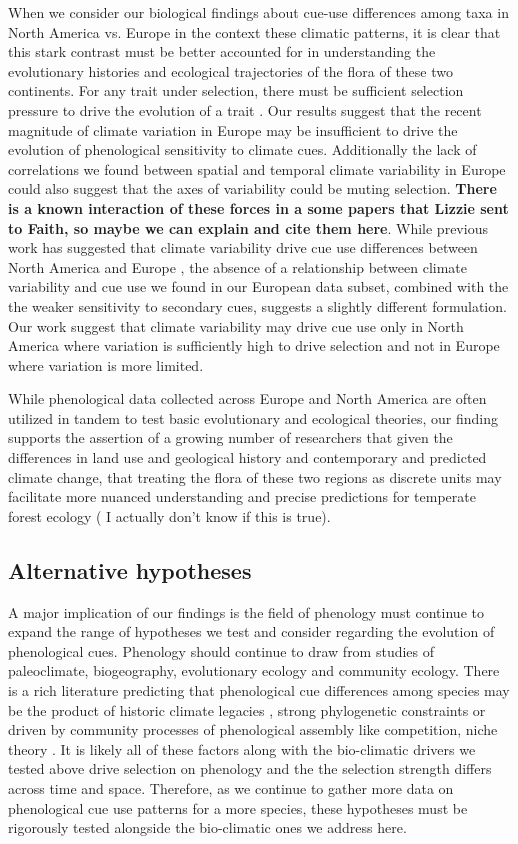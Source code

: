 \documentclass[12pt]{article}\usepackage[]{graphicx}\usepackage[]{color}
\begin{document}
\noindent When we consider our biological findings about cue-use differences among taxa in North America vs. Europe in the context these climatic patterns, it is clear that this stark contrast must be better accounted for in understanding the evolutionary histories and ecological trajectories of the flora of these two continents. For any trait under selection, there must be sufficient selection pressure to drive the evolution of a trait \citep{}. Our results suggest that the recent magnitude of climate variation in Europe may be insufficient to drive the evolution of phenological sensitivity to climate cues. Additionally the lack of correlations we found between spatial and temporal climate variability in Europe could also suggest that the axes of variability could be muting selection. \textbf{There is a known interaction of these forces in a some papers that Lizzie sent to Faith, so maybe we can explain and cite them here}. While previous work has suggested that climate variability drive cue use differences between North America and Europe \citep{Zohner:2017aa}, the absence of a relationship between climate variability and cue use we found in our European data subset, combined with the the weaker sensitivity to secondary cues, suggests a slightly different formulation. Our work suggest that climate variability may drive cue use only in North America where variation is sufficiently high to drive selection and not in Europe where variation is more limited. 

\noindeny While phenological data collected across Europe and North America are often utilized in tandem to test basic evolutionary and ecological theories, our finding supports the assertion of a growing number of researchers that given the differences in land use and geological history and contemporary and predicted climate change, that treating the flora of these two regions as discrete units may facilitate more nuanced understanding and precise predictions for temperate forest ecology ( I actually don't know if this is true).

\subsection*{Alternative hypotheses}

A major implication of our findings is the field of phenology must continue to expand the range of hypotheses we test and consider regarding the evolution of phenological cues. Phenology should continue to draw from studies of paleoclimate, biogeography, evolutionary ecology and community ecology. There is a rich literature predicting that phenological cue differences among species may be the product of historic climate legacies \citep{}, strong phylogenetic constraints \citep{} or driven by community processes of phenological assembly like competition, niche theory  \citep{}. It is likely all of these factors along with the bio-climatic drivers we tested above drive selection on phenology and the the selection strength differs across time and space. Therefore, as we continue to gather more data on phenological cue use patterns for a more species, these hypotheses must be rigorously tested alongside the bio-climatic ones we address here.
\end{document}
